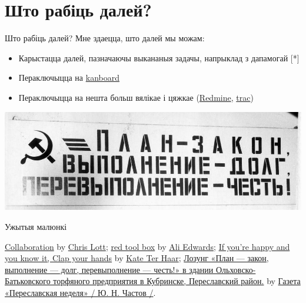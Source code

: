 \documentclass[ignorenonframetext,hyperref={pdftex,unicode}]{beamer}
\begin{document}
\section{Што рабіць далей?}
\begin{frame}{Што рабіць далей?}
	Мне здаецца, што далей мы можам:
	\begin{itemize}
		\item Карыстацца далей, пазначаючы выкананыя задачы, напрыклад з дапамогай [*]\pause
		\item Пераключыцца на \href{http://kanboard.net/}{kanboard}\pause
		\item Пераключыцца на нешта больш вялікае і цяжкае (\href{http://www.redmine.org/}{Redmine}, \href{http://trac.edgewall.org/}{trac})
	\end{itemize}
	\begin{center}
 		\includegraphics[height=0.5\textheight,keepaspectratio]{Pn-slogan-zakon}
	\end{center}
\end{frame}


\begin{frame}{Ужытыя малюнкі}
	\begin{thebibliography}{10}
	\beamertemplatetextbibitems
	\bibitem{}
		{\sc \href{https://www.flickr.com/photos/fncll/145149313}{Collaboration}} by {\sc \href{https://www.flickr.com/photos/fncll/}{Chris Lott}};
	\bibitem{}
		{\sc \href{https://www.flickr.com/photos/aliedwards/502240730}{red tool box}} by {\sc \href{https://www.flickr.com/photos/aliedwards/}{Ali Edwards}};
	\bibitem{}
		{\sc \href{https://www.flickr.com/photos/katerha/5129669316}{If you're happy and you know it, Clap your hands}} by {\sc \href{https://www.flickr.com/photos/katerha/}{Kate Ter Haar}};
	\bibitem{}
		{\sc \href{https://en.wikipedia.org/wiki/Five-year\_plans\_for\_the\_national\_economy\_of\_the\_Soviet\_Union\#/media/File:Pn-slogan-zakon.jpg}{Лозунг «План — закон, выполнение — долг, перевыполнение — честь!» в здании Ольховско-Батьковского торфяного предприятия в Кубринске, Переславский район.}} by {\sc \href{https://commons.wikimedia.org/wiki/User:\%D0\%9F\%D0\%B5\%D1\%80\%D0\%B5\%D1\%81\%D0\%BB\%D0\%B0\%D0\%B2\%D1\%81\%D0\%BA\%D0\%B0\%D1\%8F\_\%D0\%BD\%D0\%B5\%D0\%B4\%D0\%B5\%D0\%BB\%D1\%8F}{Газета «Переславская неделя» / Ю. Н. Частов /}}.
	\end{thebibliography}
\end{frame}
\end{document}
